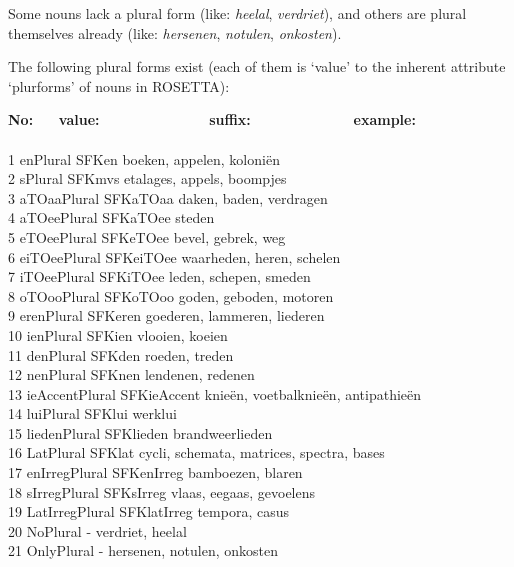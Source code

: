 Some nouns lack a plural form (like: {\em heelal}, {\em verdriet}), and others 
are plural themselves already (like: {\em hersenen}, {\em notulen}, 
{\em onkosten}).

The following plural forms exist (each of them is `value' to the inherent 
attribute `plurforms' of nouns in ROSETTA):

\begin{tabbing}
{\bf No:} \ \ \  \= {\bf value:} \ \ \ \ \ \ \ \ \ \ \ \ \ \ \  \= 
{\bf suffix:} \ \ \ \ \ \ \ \ \ \ \ \ \ \   \=  {\bf example: }\\
    \>                \>             \>             \\
1  \> enPlural        \> SFKen       \> boeken, appelen, koloni\"{e}n    \\
2  \> sPlural         \> SFKmvs      \> etalages, appels, boompjes       \\
3  \> aTOaaPlural     \> SFKaTOaa    \> daken, baden, verdragen          \\
4  \> aTOeePlural     \> SFKaTOee    \> steden                           \\
5  \> eTOeePlural     \> SFKeTOee    \> bevel, gebrek, weg               \\
6  \> eiTOeePlural    \> SFKeiTOee   \> waarheden, heren, schelen        \\
7  \> iTOeePlural     \> SFKiTOee    \> leden, schepen, smeden           \\
8  \> oTOooPlural     \> SFKoTOoo    \> goden, geboden, motoren          \\
9  \> erenPlural      \> SFKeren     \> goederen, lammeren, liederen     \\
10 \> ienPlural       \> SFKien      \> vlooien, koeien                  \\
11 \> denPlural       \> SFKden      \> roeden, treden                   \\
12 \> nenPlural       \> SFKnen      \> lendenen, redenen                \\
13 \> ieAccentPlural  \> SFKieAccent \> knie\"{e}n, voetbalknie\"{e}n, 
                                        antipathie\"{e}n   \\
14 \> luiPlural       \> SFKlui      \> werklui                          \\
15 \> liedenPlural    \> SFKlieden   \> brandweerlieden                  \\
16 \> LatPlural       \> SFKlat      \> cycli, schemata, matrices, spectra,
                                        bases \\
17 \> enIrregPlural   \> SFKenIrreg  \> bamboezen, blaren                \\
18 \> sIrregPlural    \> SFKsIrreg   \> vlaas, eegaas, gevoelens          \\ 
19 \> LatIrregPlural  \> SFKlatIrreg \> tempora, casus                   \\
20 \> NoPlural        \>    -        \> verdriet, heelal                 \\
21 \> OnlyPlural      \>    -        \> hersenen, notulen, onkosten      \\
\end{tabbing}

